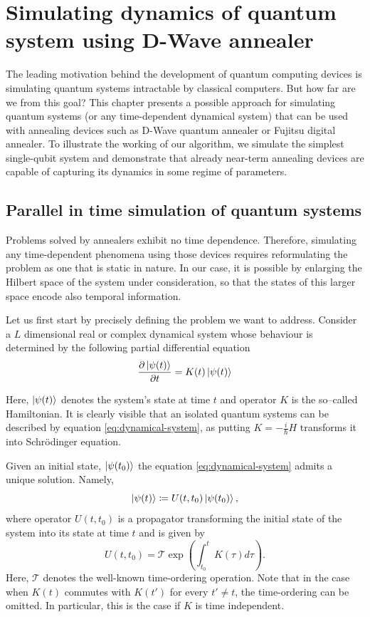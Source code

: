 \chapter{Simulating dynamics of quantum system using D-Wave annealer}
\label{chapter:simulating}

The leading motivation behind the development of quantum computing devices is simulating quantum systems intractable by classical computers. But how far are we from this goal? This chapter presents a possible approach for simulating quantum systems (or any time-dependent dynamical system) that can be used with annealing devices such as D-Wave quantum annealer or Fujitsu digital annealer. To illustrate the working of our algorithm, we simulate the simplest single-qubit system and demonstrate that already near-term annealing devices are capable of capturing its dynamics in some regime of parameters.

\section{Parallel in time simulation of quantum systems}
Problems solved by annealers exhibit no time dependence. Therefore, simulating any time-dependent phenomena using those devices requires reformulating the problem as one that is static in nature. In our case, it is possible by enlarging the Hilbert space of the system under consideration, so that the states of this larger space encode also temporal information.

Let us first start by precisely defining the problem we want to address.
Consider a $L$ dimensional real or complex dynamical system whose behaviour is determined by the following partial differential equation
\begin{equation}
\label{eq:dynamical-system}
    \frac{\partial \ket{\psi(t)}}{\partial t} = K(t) \ket{\psi(t)}
\end{equation}

Here, $\ket{\psi(t)}$ denotes the system's state at time $t$ and operator $K$ is the so--called Hamiltonian. It is clearly visible that an isolated quantum systems can be described by equation \eqref{eq:dynamical-system}, as putting $K=-\frac{i}{\hbar}H$ transforms it into Schr\"{o}dinger equation.

Given an initial state, $\ket{\psi(t_0)}$ the equation \eqref{eq:dynamical-system}
admits a unique solution. Namely,
\begin{equation}
    \ket{\psi(t)} \coloneqq U(t, t_0) \ket{\psi(t_0)},
\end{equation}
where operator $U(t, t_0)$ is a propagator transforming the initial state of
the system into its state at time $t$ and is given by
\begin{equation}
    \label{eq:propagator}
    U(t, t_0) = \mathcal{T} \exp \left( \int_{t_0}^t K(\tau)d\tau \right).
\end{equation}
Here, $\mathcal{T}$ denotes the well-known time-ordering operation.
Note that in the case when $K(t)$ commutes with $K(t')$ for every $t' \ne t$, the
time-ordering can be omitted. In particular, this is the case if $K$ is time
independent.

